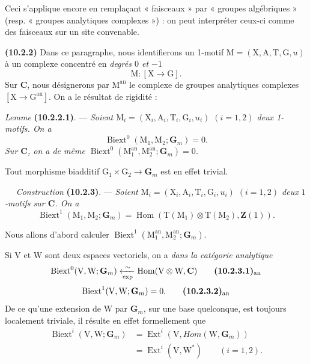 \documentclass[11pt,leqno]{article}
\newcommand{\Page}[1]{\ifvmode\noindent\else\unskip\ \fi{\footnotesize\textcolor{gray}{[p.\,#1]}}\ \ignorespaces}
\begin{document}
Ceci s’applique encore en remplaçant « faisceaux » par « groupes
algébriques » (resp. « groupes analytiques complexes ») : on peut
interpréter ceux-ci comme des faisceaux sur un site convenable.

\textbf{(10.2.2)} Dans ce paragraphe, nous identifierons un 1-motif
\(\mathrm{M}=(\mathrm{X},\mathrm{A},\mathrm{T},\mathrm{G},u)\)
à un complexe concentré en \textit{degrés \(0\) et \(-1\)}
\[
\mathrm{M}:[\mathrm{X}\to\mathrm{G}].
\]
Sur \(\mathbf{C}\), nous désignerons par \(\mathrm{M}^{\mathrm{an}}\)
le complexe de groupes analytiques complexes
\([\mathrm{X}\to\mathrm{G}^{\mathrm{an}}]\).
On a le résultat de rigidité :

\textit{Lemme} \textbf{(10.2.2.1)}. —
\textit{Soient
\(\mathrm{M}_i=(\mathrm{X}_i,\mathrm{A}_i,\mathrm{T}_i,\mathrm{G}_i,u_i)\)
\((i=1,2)\) deux 1-motifs. On a}
\[
\operatorname{Biext}^0(\mathrm{M}_1,\mathrm{M}_2;\mathbf{G}_m)=0.
\]
\textit{Sur \(\mathbf{C}\), on a de même
\(\operatorname{Biext}^0
(\mathrm{M}_1^{\mathrm{an}},\mathrm{M}_2^{\mathrm{an}};\mathbf{G}_m)=0\).}

Tout morphisme biadditif
\(\mathrm{G}_1\times\mathrm{G}_2\to\mathbf{G}_m\)
est en effet trivial.

\Page{61}
\textit{Construction} \textbf{(10.2.3)}. — \textit{Soient
\(\mathrm{M}_i=(\mathrm{X}_i,\mathrm{A}_i,\mathrm{T}_i,\mathrm{G}_i,u_i)\)
\((i=1,2)\) deux \(1\)-motifs sur \(\mathbf{C}\). On a}
\[
\operatorname{Biext}^{1}(\mathrm{M}_1,\mathrm{M}_2;\mathbf{G}_m)
=\operatorname{Hom}(\mathrm{T}(\mathrm{M}_1)\otimes
\mathrm{T}(\mathrm{M}_2),\mathbf{Z}(1)).
\]

Nous allons d’abord calculer
\(\operatorname{Biext}^{1}(\mathrm{M}_1^{\mathrm{an}},
\mathrm{M}_2^{\mathrm{an}};\mathbf{G}_m)\).

Si \(\mathrm{V}\) et \(\mathrm{W}\) sont deux espaces vectoriels, on a
\textit{dans la catégorie analytique}
\[
\operatorname{Biext}^{0}(\mathrm{V},\mathrm{W};\mathbf{G}_m)
\xleftarrow[\exp]{\sim}
\operatorname{Hom}(\mathrm{V}\otimes\mathrm{W},\mathbf{C})
\tag*{\textbf{(10.2.3.1)}\textsubscript{an}}
\]
\[
\operatorname{Biext}^{1}(\mathrm{V},\mathrm{W};\mathbf{G}_m)=0.
\tag*{\textbf{(10.2.3.2)}\textsubscript{an}}
\]
De ce qu’une extension de \(\mathrm{W}\) par \(\mathbf{G}_m\), sur une base
quelconque, est toujours localement triviale, il résulte en effet
formellement que
\[
\begin{aligned}
\operatorname{Biext}^{i}(\mathrm{V},\mathrm{W};\mathbf{G}_m)
&=\operatorname{Ext}^{i}(\mathrm{V},
  \mathit{Hom}(\mathrm{W},\mathbf{G}_m))\\
&=\operatorname{Ext}^{i}(\mathrm{V},\mathrm{W}^{*})
\qquad(i=1,2).
\end{aligned}
\]
\end{document}
